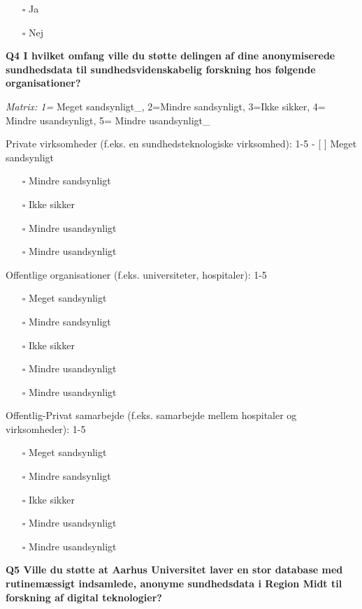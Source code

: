 \documentclass[
]{article}
\providecommand{\tightlist}{%
  \setlength{\itemsep}{0pt}\setlength{\parskip}{0pt}}
\begin{document}
\begin{itemize}
\tightlist
\item[$\square$]
  Ja
\item[$\square$]
  Nej
\end{itemize}

\textbf{Q4 I hvilket omfang ville du støtte delingen af dine
anonymiserede sundhedsdata til sundhedsvidenskabelig forskning hos
følgende organisationer?}

\emph{Matrix: 1=} Meget sandsynligt\_, 2=Mindre sandsynligt, 3=Ikke
sikker, 4= Mindre usandsynligt, 5= Mindre usandsynligt\_

Private virksomheder (f.eks. en sundhedsteknologiske virksomhed): 1-5 -
{[} {]} Meget sandsynligt

\begin{itemize}
\item[$\square$]
  Mindre sandsynligt
\item[$\square$]
  Ikke sikker
\item[$\square$]
  Mindre usandsynligt
\item[$\square$]
  Mindre usandsynligt
\end{itemize}

Offentlige organisationer (f.eks. universiteter, hospitaler): 1-5

\begin{itemize}
\item[$\square$]
  Meget sandsynligt
\item[$\square$]
  Mindre sandsynligt
\item[$\square$]
  Ikke sikker
\item[$\square$]
  Mindre usandsynligt
\item[$\square$]
  Mindre usandsynligt
\end{itemize}

Offentlig-Privat samarbejde (f.eks. samarbejde mellem hospitaler og
virksomheder): 1-5

\begin{itemize}
\item[$\square$]
  Meget sandsynligt
\item[$\square$]
  Mindre sandsynligt
\item[$\square$]
  Ikke sikker
\item[$\square$]
  Mindre usandsynligt
\item[$\square$]
  Mindre usandsynligt
\end{itemize}

\textbf{Q5 Ville du støtte at Aarhus Universitet laver en stor database
med rutinemæssigt indsamlede, anonyme sundhedsdata i Region Midt til
forskning af digital teknologier?}
\end{document}
